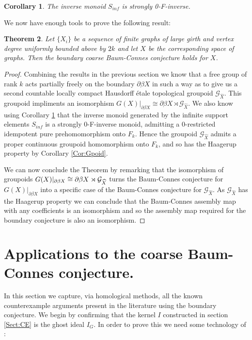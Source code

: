 \documentclass[11pt]{amsart}
\theoremstyle{plain}
\newtheorem{theorem}{Theorem}%
\newtheorem{corollary}[theorem]{Corollary}%
\theoremstyle{definition}%
\theoremstyle{remark}%
\newcommand{\G}{\mathcal{G}}
\begin{document}
\begin{corollary}\label{Cor:MT}
The inverse monoid $S_{inf}$ is strongly 0-F-inverse.
\end{corollary}

We now have enough tools to prove the following result:
\begin{theorem}
Let $\lbrace X_{i} \rbrace$ be a sequence of finite graphs of large girth and vertex degree uniformly bounded above by $2k$ and let $X$ be the corresponding space of graphs. Then the boundary coarse Baum-Connes conjecture holds for $X$. 
\end{theorem}
\begin{proof}
Combining the results in the previous section we know that a free group of rank $k$ acts partially freely on the boundary $\partial\beta X$ in such a way as to give us a second countable locally compact Hausdorff \'etale topological groupoid $\G_{\widehat{X}}$. This groupoid impliments an isomorphism $G(X)|_{\partial\beta X} \cong \partial\beta X \rtimes \G_{\widehat{X}}$. We also know using Corollary \ref{Cor:MT} that the inverse monoid generated by the infinite support elements $S_{inf}$ is a strongly $0$-F-inverse monoid, admitting a $0$-restricted idempotent pure prehomomorphism onto $F_{k}$. Hence the groupoid $\G_{\widehat{X}}$ admits a proper continuous groupoid homomorphism onto $F_{k}$, and so has the Haagerup property by Corollary \ref{Cor:Gpoid}. 

We can now conclude the Theorem by remarking that the isomorphism of groupoids $G(X)|_{\partial\beta X} \\ \cong \partial\beta X \rtimes \G_{\widehat{X}}$ turns the Baum-Connes conjecture for $G(X)|_{\partial\beta X}$ into a specific case of the Baum-Connes conjecture for $\G_{\widehat{X}}$. As $\G_{\widehat{X}}$ has the Haagerup property we can conclude that the Baum-Connes assembly map with any coefficients is an isomorphism \cite{MR1798599} and so the assembly map required for the boundary conjecture is also an isomorphism.
\end{proof}

\section{Applications to the coarse Baum-Connes conjecture.}\label{Sect:apps}
In this section we capture, via homological methods, all the known counterexample arguments present in the literature using the boundary conjecture. We begin by confirming that the kernel $I$ constructed in section \ref{Sect:CE} is the ghost ideal $I_{G}$. In order to prove this we need some technology of \cite{MR1911663}:
\end{document}
